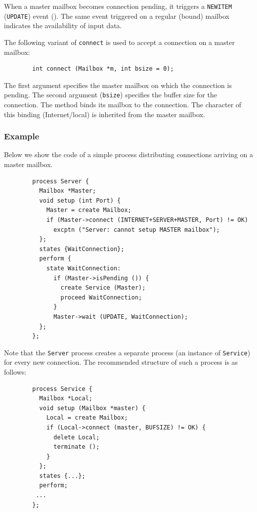 When a master mailbox becomes connection pending, it triggers a
{\tt NEWITEM} ({\tt UPDATE}) event ().
The same event triggered on a regular (bound) mailbox indicates the
availability of input data.

The following variant of {\tt connect} is used to accept a connection
on a master mailbox:
\begin{verbatim}
        int connect (Mailbox *m, int bsize = 0);
\end{verbatim}
The first argument specifies the master mailbox on which the connection
is pending.
The second argument ({\tt bsize}) specifies the buffer size for the
connection.
The method binds its mailbox to the connection.
The character of this binding (Internet/local) is inherited from the
master mailbox.

\subsubsection*{Example}

\noindent
Below we show the code of a simple process distributing connections arriving
on a master mailbox.

\begin{verbatim}
        process Server {
          Mailbox *Master;
          void setup (int Port) {
            Master = create Mailbox;
            if (Master->connect (INTERNET+SERVER+MASTER, Port) != OK)
              excptn ("Server: cannot setup MASTER mailbox");
          };
          states {WaitConnection};
          perform {
            state WaitConnection:
              if (Master->isPending ()) {
                create Service (Master);
                proceed WaitConnection;
              }
              Master->wait (UPDATE, WaitConnection);
          };
        };
\end{verbatim}

Note that the {\tt Server} process creates a separate process (an instance
of {\tt Service}) for every new connection.
The recommended structure of such a process is as follows:

\begin{verbatim}
        process Service {
          Mailbox *Local;
          void setup (Mailbox *master) {
            Local = create Mailbox;
            if (Local->connect (master, BUFSIZE) != OK) {
              delete Local;
              terminate ();
            }
          };
          states {...};
          perform;
         ...
        };
\end{verbatim}

